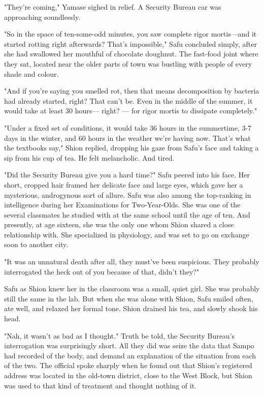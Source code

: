 "They're coming," Yamase sighed in relief. A Security Bureau car was
approaching soundlessly.

\myspace

"So in the space of ten-some-odd minutes, you saw complete rigor
mortis---and it started rotting right afterwards? That's impossible," Safu
concluded simply, after she had swallowed her mouthful of chocolate
doughnut. The fast-food joint where they sat, located near the older
parts of town was bustling with people of every shade and colour.

"And if you're saying you smelled rot, then that means decomposition by
bacteria had already started, right? That can't be. Even in the middle
of the summer, it would take at least 30 hours--- right? --- for rigor
mortis to dissipate completely."

"Under a fixed set of conditions, it would take 36 hours in the
summertime, 3-7 days in the winter, and 60 hours in the weather we're
having now. That's what the textbooks say," Shion replied, dropping his
gaze from Safu's face and taking a sip from his cup of tea. He felt
melancholic. And tired.

"Did the Security Bureau give you a hard time?" Safu peered into his
face. Her short, cropped hair framed her delicate face and large eyes,
which gave her a mysterious, androgynous sort of allure. Safu was also
among the top-ranking in intelligence during her Examinations for
Two-Year-Olds. She was one of the several classmates he studied with at
the same school until the age of ten. And presently, at age sixteen, she
was the only one whom Shion shared a close relationship with. She
specialized in physiology, and was set to go on exchange soon to another
city.

"It was an unnatural death after all, they must've been suspicious. They
probably interrogated the heck out of you because of that, didn't they?"

Safu as Shion knew her in the classroom was a small, quiet girl. She was
probably still the same in the lab. But when she was alone with Shion,
Safu smiled often, ate well, and relaxed her formal tone. Shion drained
his tea, and slowly shook his head.

"Nah, it wasn't as bad as I thought." Truth be told, the Security
Bureau's interrogation was surprisingly short. All they did was seize
the data that Sampo had recorded of the body, and demand an explanation
of the situation from each of the two. The official spoke sharply when
he found out that Shion's registered address was located in the old-town
district, close to the West Block, but Shion was used to that kind of
treatment and thought nothing of it.


